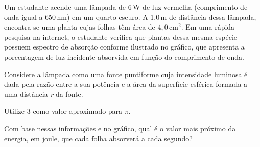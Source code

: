 Um estudante acende uma lâmpada de 6\,W de luz vermelha (comprimento de onda igual a 650\,nm) em um quarto escuro. A 1,0\,m de distância dessa lâmpada, encontra-se uma planta cujas folhas têm área de $4{,}0\,\text{cm}^2$. Em uma rápida pesquisa na internet, o estudante verifica que plantas dessa mesma espécie possuem espectro de absorção conforme ilustrado no gráfico, que apresenta a porcentagem de luz incidente absorvida em função do comprimento de onda.\par
{}
Considere a lâmpada como uma fonte puntiforme cuja intensidade luminosa é dada pela razão entre a sua potência e a área da superfície esférica formada a uma distância \textit{r} da fonte.\par
Utilize 3 como valor aproximado para $\pi$.\par
Com base nessas informações e no gráfico, qual é o valor mais próximo da energia, em joule, que cada folha absorverá a cada segundo?\par
\begin{altlinha}
%
%
%
%
\end{altlinha}
